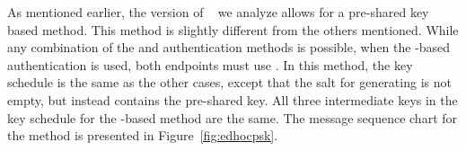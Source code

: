 \documentclass[runningheads, envcountsame, hidelinks, a4paper, draft, x11names]{llncs}
\begin{document}
As mentioned earlier, the version of
\mEdhoc{}~\cite{our-analysis-selander-lake-edhoc-00} we analyze allows for a
pre-shared key based method.
%
This method is slightly different from the others mentioned.
%
While any combination of the \mSig{} and \mStat{} authentication methods is
possible, when the \mPsk{}-based authentication is used, both endpoints must
use \mPsk{}.
In this method, the key schedule is the same as the other cases, except that the
salt for generating \mPRKtwo{} is not empty, but instead contains the
pre-shared key.
%
All three intermediate keys in the key schedule for the \mPsk{}-based method
are the same.
%
The message sequence chart for the \mPsk{} method is presented in
Figure~\ref{fig:edhocpsk}.

\end{document}
